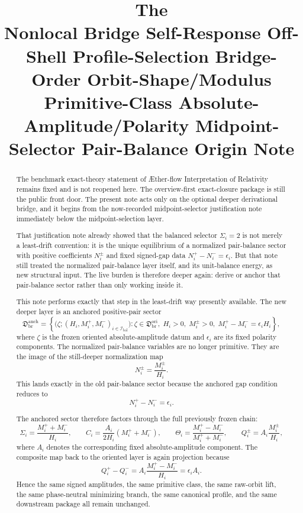 \documentclass[11pt]{article}
\title{\textbf{The \TheoryName{}}\\[0.4em]
\large Nonlocal Bridge Self-Response Off-Shell Profile-Selection Bridge-Order Orbit-Shape/Modulus Primitive-Class Absolute-Amplitude/Polarity Midpoint-Selector Pair-Balance Origin Note}
\author{}
\date{}
\newcommand{\Aflow}{\AE{}ther-flow}
\newcommand{\TheoryName}{\Aflow{} Interpretation of Relativity}
\newcommand{\OriginSector}{\mathfrak D_{\mathrm{br}}^{\mathrm{ori}}}
\newcommand{\BalOriginSector}{\mathfrak D_{\mathrm{br}}^{\mathrm{anch}}}
\newcommand{\BalIndex}{\mathcal I_{\mathrm{bal}}}
\begin{document}
\maketitle

\begin{abstract}
The benchmark exact-theory statement of \TheoryName{} remains fixed and is not reopened here. The overview-first exact-closure package is still the public front door. The present note acts only on the optional deeper derivational bridge, and it begins from the now-recorded midpoint-selector justification note immediately below the midpoint-selection layer.

That justification note already showed that the balanced selector \(\Sigma_i=2\) is not merely a least-drift convention: it is the unique equilibrium of a normalized pair-balance sector with positive coefficients \(N_i^\pm\) and fixed signed-gap data \(N_i^+-N_i^-=\epsilon_i\). But that note still treated the normalized pair-balance layer itself, and its unit-balance energy, as new structural input. The live burden is therefore deeper again: derive or anchor that pair-balance sector rather than only working inside it.

This note performs exactly that step in the least-drift way presently available. The new deeper layer is an anchored positive-pair sector
\[
\BalOriginSector
=
\left\{
\bigl(\zeta;(H_i,M_i^+,M_i^-)_{i\in\BalIndex}\bigr)
:
\zeta\in\OriginSector,\;
H_i>0,\;
M_i^\pm>0,\;
M_i^+-M_i^-=\epsilon_i H_i
\right\},
\]
where \(\zeta\) is the frozen oriented absolute-amplitude datum and \(\epsilon_i\) are its fixed polarity components. The normalized pair-balance variables are no longer primitive. They are the image of the still-deeper normalization map
\[
N_i^\pm=\frac{M_i^\pm}{H_i}.
\]
This lands exactly in the old pair-balance sector because the anchored gap condition reduces to
\[
N_i^+-N_i^-=\epsilon_i.
\]

The anchored sector therefore factors through the full previously frozen chain:
\[
\Sigma_i=\frac{M_i^++M_i^-}{H_i},
\qquad
C_i=\frac{A_i}{2H_i}(M_i^++M_i^-),
\qquad
\Theta_i=\frac{M_i^+-M_i^-}{M_i^++M_i^-},
\qquad
Q_i^\pm=A_i\frac{M_i^\pm}{H_i},
\]
where \(A_i\) denotes the corresponding fixed absolute-amplitude component. The composite map back to the oriented layer is again projection because
\[
Q_i^+-Q_i^-
=
A_i\frac{M_i^+-M_i^-}{H_i}
=
\epsilon_i A_i.
\]
Hence the same signed amplitudes, the same primitive class, the same raw-orbit lift, the same phase-neutral minimizing branch, the same canonical profile, and the same downstream package all remain unchanged.


\end{abstract}
\end{document}
